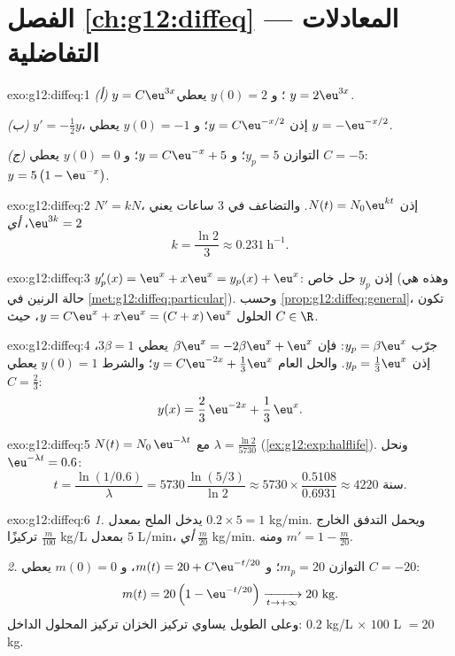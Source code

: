 \section*{الفصل \ref{ch:g12:diffeq} --- المعادلات التفاضلية}

\begin{solution}{exo:g12:diffeq:1}
\emph{(أ)} $y = C\eu^{3x}$؛ و $y(0) = 2$ يعطي $y = 2\eu^{3x}$.

\emph{(ب)} $y' = -\frac12 y$، إذن $y = C\eu^{-x/2}$؛ و $y(0) = -1$ يعطي
$y = -\eu^{-x/2}$.

\emph{(ج)} التوازن $y_p = 5$؛ و $y = C\eu^{-x} + 5$؛ و $y(0) = 0$ يعطي
$C = -5$: $y = 5\left(1 - \eu^{-x}\right)$.
\end{solution}

\begin{solution}{exo:g12:diffeq:2}
$N' = kN$، إذن $N(t) = N_0 \eu^{kt}$. والتضاعف في $3$ ساعات يعني
$\eu^{3k} = 2$، \emph{أي}
\[
k = \frac{\ln 2}{3} \approx 0.231\ \text{h}^{-1}.
\]
\end{solution}

\begin{solution}{exo:g12:diffeq:3}
$y_p'(x) = \eu^x + x\eu^x = y_p(x) + \eu^x$: إذن $y_p$ حل خاص
(وهذه هي حالة الرنين في \cref{met:g12:diffeq:particular}). وحسب
\cref{prop:g12:diffeq:general}، تكون الحلول
$y = C\eu^{x} + x\eu^{x} = (C + x)\,\eu^x$، حيث $C \in \R$.
\end{solution}

\begin{solution}{exo:g12:diffeq:4}
جرّب $y_p = \beta\eu^x$: فإن $\beta\eu^x = -2\beta\eu^x + \eu^x$ يعطي
$3\beta = 1$، إذن $y_p = \frac13\eu^x$. والحل العام
$y = C\eu^{-2x} + \frac13\eu^{x}$؛ والشرط $y(0) = 1$ يعطي
$C = \frac23$:
\[
y(x) = \frac{2}{3}\,\eu^{-2x} + \frac{1}{3}\,\eu^{x}.
\]
\end{solution}

\begin{solution}{exo:g12:diffeq:5}
$N(t) = N_0\,\eu^{-\lambda t}$ مع $\lambda = \frac{\ln 2}{5730}$
(\cref{ex:g12:exp:halflife}). ونحل $\eu^{-\lambda t} = 0.6$:
\[
t = \frac{\ln(1/0.6)}{\lambda} = 5730\,\frac{\ln(5/3)}{\ln 2}
\approx 5730 \times \frac{0.5108}{0.6931} \approx 4220 \text{ سنة}.
\]
\end{solution}

\begin{solution}{exo:g12:diffeq:6}
\emph{1.} يدخل الملح بمعدل $0.2 \times 5 = 1$ kg/min. ويحمل التدفق الخارج
تركيزًا $\frac{m}{100}$ kg/L بمعدل $5$ L/min، \emph{أي} $\frac{m}{20}$
kg/min. ومنه $m' = 1 - \frac{m}{20}$.

\emph{2.} التوازن $m_p = 20$؛ و $m(t) = 20 + C\eu^{-t/20}$، و
$m(0) = 0$ يعطي $C = -20$:
\[
m(t) = 20\left(1 - \eu^{-t/20}\right) \xrightarrow[t\to+\infty]{} 20 \text{ kg}.
\]
وعلى  الطويل يساوي تركيز الخزان تركيز المحلول الداخل:
$0.2$ kg/L $\times$ $100$ L $= 20$ kg.
\end{solution}

